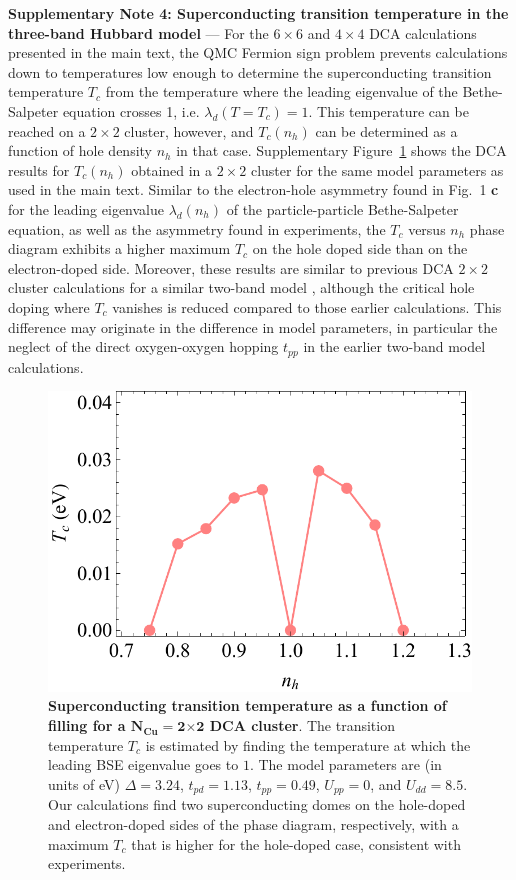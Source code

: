 \documentclass[11pt,superscriptaddress,floatfix,notitlepage]{revtex4-1}
\begin{document}
\newpage\noindent\textbf{Supplementary Note 4: Superconducting transition temperature in the three-band Hubbard model} --- 
For the $6\times 6$ and $4\times 4$ DCA calculations presented in the main text, the QMC Fermion sign problem prevents calculations down to temperatures low enough to determine the superconducting transition temperature $T_c$ from the temperature where the leading eigenvalue of the Bethe-Salpeter equation crosses 1, i.e. $\lambda_d(T=T_c)=1$. This temperature can be reached on a $2\times 2$ cluster, however, and $T_c(n_h)$ can be determined as a function of hole density $n_h$ in that case. Supplementary Figure~\ref{Fig:dcaTcvsn2by2Upp0SM} shows the DCA results for $T_c(n_h)$ obtained in a $2\times 2$ cluster for the same model parameters as used in the main text. Similar to the electron-hole asymmetry found in Fig.~1 {\bf c} for the leading eigenvalue $\lambda_d(n_h)$ of the particle-particle Bethe-Salpeter equation, as well as the asymmetry found in experiments, the $T_c$ versus $n_h$ phase diagram exhibits a higher maximum $T_c$ on the hole doped side than on the electron-doped side. Moreover, these results are similar to previous DCA $2\times 2$ cluster calculations for a similar two-band model \cite{Macridin}, although the critical hole doping where $T_c$ vanishes is reduced compared to those earlier calculations. This difference may originate in the difference in model parameters, in particular the neglect of the direct oxygen-oxygen hopping $t_{pp}$ in the earlier two-band model calculations. 

\begin{figure}[ht]
\centering
\includegraphics[width=0.5\linewidth]{./Figures/dcaTcvsn2by2Upp0SM.pdf}
\caption{{\bf Superconducting transition temperature as a function of filling for a $\mathbf{N_\text{Cu}\boldsymbol{=}2\boldsymbol{\times}2}$ DCA cluster}. The transition temperature $T_c$ is estimated by finding the temperature at which the leading BSE eigenvalue goes to $1$. The model parameters are (in units of eV) $\Delta = 3.24$, $t_{pd}=1.13$, $t_{pp}=0.49$, $U_{pp} = 0$, and $U_{dd}=8.5$. Our calculations find two superconducting domes on the hole-doped and electron-doped sides of the phase diagram, respectively, with a maximum $T_c$ that is higher for the hole-doped case, consistent  with experiments.}
\label{Fig:dcaTcvsn2by2Upp0SM}
\end{figure}
\end{document}
